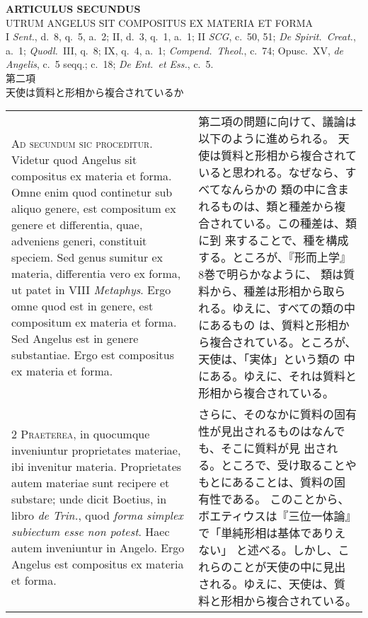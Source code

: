 \documentclass[10pt]{jsarticle} %
\begin{document}
\begin{center}
 {\Large {\bf ARTICULUS SECUNDUS}}\\
 {\large UTRUM ANGELUS SIT COMPOSITUS EX MATERIA ET FORMA}\\
 {\footnotesize I {\itshape Sent.}, d.~8, q.~5, a.~2; II, d.~3, q.~1,
 a.~1; II {\itshape SCG}, c.~50, 51; {\itshape De Spirit.~Creat.}, a.~1;
 {\itshape Quodl.}~III, q.~8; IX, q.~4, a.~1; {\itshape
 Compend.~Theol.}, c.~74; Opusc.~XV, {\itshape de Angelis}, c.~5 seqq.;
 c.~18; {\itshape De Ent.~et Ess.}, c.~5.}\\
 {\Large 第二項\\天使は質料と形相から複合されているか}
\end{center}

\begin{longtable}{p{21em}p{21em}}

{\huge A}{\scshape d secundum sic proceditur}. Videtur quod Angelus sit
compositus ex materia et forma. Omne enim quod continetur sub aliquo
genere, est compositum ex genere et differentia, quae, adveniens generi,
constituit speciem. Sed genus sumitur ex materia, differentia vero ex
forma, ut patet in VIII {\itshape Metaphys}. Ergo omne quod est in
genere, est compositum ex materia et forma. Sed Angelus est in genere
substantiae. Ergo est compositus ex materia et forma.


&

第二項の問題に向けて、議論は以下のように進められる。
天使は質料と形相から複合されていると思われる。なぜなら、すべてなんらかの
 類の中に含まれるものは、類と種差から複合されている。この種差は、類に到
 来することで、種を構成する。ところが、『形而上学』8巻で明らかなように、
 類は質料から、種差は形相から取られる。ゆえに、すべての類の中にあるもの
 は、質料と形相から複合されている。ところが、天使は、「実体」という類の
 中にある。ゆえに、それは質料と形相から複合されている。

\\


{\scshape 2 Praeterea}, in quocumque inveniuntur proprietates materiae,
ibi invenitur materia. Proprietates autem materiae sunt recipere et
substare; unde dicit Boetius, in libro {\itshape de Trin.}, quod
{\itshape forma simplex subiectum esse non potest}. Haec autem
inveniuntur in Angelo. Ergo Angelus est compositus ex materia et forma.


&

さらに、そのなかに質料の固有性が見出されるものはなんでも、そこに質料が見
 出される。ところで、受け取ることやもとにあることは、質料の固有性である。
 このことから、ボエティウスは『三位一体論』で「単純形相は基体でありえない」
 と述べる。しかし、これらのことが天使の中に見出される。ゆえに、天使は、質
 料と形相から複合されている。


\end{longtable}
\end{document}
